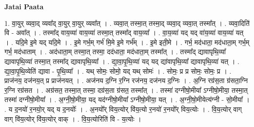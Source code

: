 \documentclass[17pt]{extarticle}
\begin{document}
\textbf{Jatai Paata} \newline

1. वा॒युर् व्यवा॒द् व्यवा᳚द् वा॒युर् वा॒युर् व्यवा᳚त् । . व्यवा॒त् तस्मा॒त् तस्मा॒द् व्यवा॒द् व्यवा॒त् तस्मा᳚त् । . व्यवा॒दिति॑ वि - अवा᳚त् । . तस्मा᳚द् वाय॒व्या॑ वाय॒व्या॑ तस्मा॒त् तस्मा᳚द् वाय॒व्या᳚ । . वा॒य॒व्या॑ यद् यद् वा॑य॒व्या॑ वाय॒व्या॑ यत् । . यदि॒मे इ॒मे यद् यदि॒मे । . इ॒मे गर्भ॒म् गर्भ॑ मि॒मे इ॒मे गर्भ᳚म् । . इ॒मे इती॒मे । . गर्भ॒ मद॑धाता॒ मद॑धाता॒म् गर्भ॒म् गर्भ॒ मद॑धाताम् । . अद॑धाता॒म् तस्मा॒त् तस्मा॒ दद॑धाता॒ मद॑धाता॒म् तस्मा᳚त् । . तस्मा᳚द् द्यावापृथि॒व्या᳚ द्यावापृथि॒व्या॑ तस्मा॒त् तस्मा᳚द् द्यावापृथि॒व्या᳚ । . द्या॒वा॒पृ॒थि॒व्या॑ यद् यद् द्या॑वापृथि॒व्या᳚ द्यावापृथि॒व्या॑ यत् । . द्या॒वा॒पृ॒थि॒व्येति॑ द्यावा - पृ॒थि॒व्या᳚ । . यथ् सोमः॒ सोमो॒ यद् यथ् सोमः॑ । . सोमः॒ प्र प्र सोमः॒ सोमः॒ प्र । . प्राज॑नय॒ दज॑नय॒त् प्र प्राज॑नयत् । . अज॑नय द॒ग्नि र॒ग्नि रज॑नय॒ दज॑नय द॒ग्निः । . अ॒ग्नि रग्र॑स॒ता ग्र॑सता॒ग्नि र॒ग्नि रग्र॑सत । . अग्र॑सत॒ तस्मा॒त् तस्मा॒ दग्र॑स॒ता ग्र॑सत॒ तस्मा᳚त् । . तस्मा॑ दग्नीषो॒मीया᳚ ऽग्नीषो॒मीया॒ तस्मा॒त् तस्मा॑ दग्नीषो॒मीया᳚ । . अ॒ग्नी॒षो॒मीया॒ यद् यद॑ग्नीषो॒मीया᳚ ऽग्नीषो॒मीया॒ यत् । . अ॒ग्नी॒षो॒मीयेत्य॑ग्नी - सो॒मीया᳚ । . य द॒नयो॑ र॒नयो॒र् यद् य द॒नयोः᳚ । . अ॒नयो᳚र् विय॒त्योर् वि॑य॒त्यो र॒नयो॑ र॒नयो᳚र् विय॒त्योः । . वि॒य॒त्योर् वाग् वाग् वि॑य॒त्योर् वि॑य॒त्योर् वाक् । . वि॒य॒त्योरिति॑ वि - य॒त्योः । \newline
\end{document}
